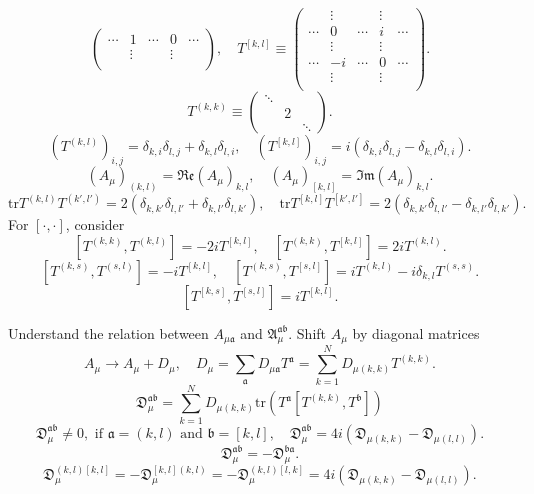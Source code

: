 \begin{correct}
\[\begin{pmatrix}
			 \cdots& 1 & \cdots& 0 &\cdots \\
			 & \vdots& & \vdots& \\
		\end{pmatrix},\quad
		T^{[k,l]}\equiv
		\begin{pmatrix}
			 & \vdots& & \vdots& \\
			 \cdots& 0 & \cdots & i & \cdots\\
			 & \vdots& & \vdots& \\
			 \cdots& -i & \cdots& 0 &\cdots \\
			 & \vdots& & \vdots& \\
		\end{pmatrix}
	.\] 
	\[
		T^{(k,k)} \equiv
		\begin{pmatrix}
			\ddots & &\\
				   & 2 & \\
				   & & \ddots
		\end{pmatrix}
	.\] 
	\[
		(T^{(k,l)})_{i,j} = \delta_{k,i}\delta_{l,j} + \delta_{k,l}\delta_{l,i},\quad
		(T^{[k,l]})_{i,j} = i (\delta_{k,i}\delta_{l,j} - \delta_{k,l}\delta_{l,i})
	.\] 
	\[
		(A_\mu)_{(k,l)} = \mathfrak{Re} (A_\mu)_{k,l},\quad
		(A_\mu)_{[k,l]} = \mathfrak{Im} (A_\mu)_{k,l}
	.\] 
	\[
		\mathrm{tr} T^{(k,l)} T^{(k',l')} = 2(\delta_{k,k'} \delta_{l,l'}
		+ \delta_{k,l'} \delta_{l,k'}),\quad
		\mathrm{tr} T^{[k,l]} T^{[k',l']} = 2(\delta_{k,k'} \delta_{l,l'}
		- \delta_{k,l'} \delta_{l,k'})
	.\] 
For $[\cdot,\cdot]$, consider
\[
	[T^{(k,k)},T^{(k,l)}] = -2 i T^{[k,l]},\quad
	[T^{(k,k)},T^{[k,l]}] =  2i T^{(k,l)}
.\]
\[
	[T^{(k,s)},T^{(s,l)}]= -i T^{[k,l]},\quad
	[T^{(k,s)},T^{[s,l]}] = i T^{(k,l)} - i \delta_{k,l} T^{(s,s)}
.\] 
\[
	[T^{[k,s]},T^{[s,l]}] = i T^{[k,l]}
.\] 
\end{correct}

Understand the relation between $A_{\mu \mathfrak{a}}$ 
and $\mathfrak{A}^{\mathfrak{a}\mathfrak{b}}_\mu$.
Shift $A_{\mu}$ by diagonal matrices
\[
	A_\mu \to A_\mu + D_\mu,\quad D_\mu = \sum_{\mathfrak{a}} D_{\mu \mathfrak{a}} T^{\mathfrak{a}}
	= \sum_{k=1}^N D_{\mu (k,k)} T^{(k,k)}
.\] 
\begin{equation}
	\mathfrak{D}_\mu^{\mathfrak{a}\mathfrak{b}}
	= \sum_{k=1}^N D_{\mu (k,k)}
	\mathrm{tr} (T^{\mathfrak{a}}[T^{(k,k)},T^{\mathfrak{b}}])
\end{equation}
\[
	\mathfrak{D}_\mu^{\mathfrak{a}\mathfrak{b}} \neq 0 ,\text{ if }
		\mathfrak{a} = (k,l) \text{ and } \mathfrak{b} = [k,l]
		,\quad \mathfrak{D}_\mu^{\mathfrak{a}\mathfrak{b}} = 4i (\mathfrak{D}_{\mu(k,k)}- \mathfrak{D}_{\mu (l,l)})
.\] 
\[
	\mathfrak{D}_{\mu}^{\mathfrak{a}\mathfrak{b}} = - \mathfrak{D}_\mu^{\mathfrak{b}\mathfrak{a}}
.\] 
\[
	\mathfrak{D}_\mu^{(k,l)[k,l]} = - \mathfrak{D}_\mu^{[k,l](k,l)}
	= - \mathfrak{D}_\mu^{(k,l)[l,k]}
	= 4i (\mathfrak{D}_{\mu(k,k)} - \mathfrak{D}_{\mu (l,l)})
.\] 

